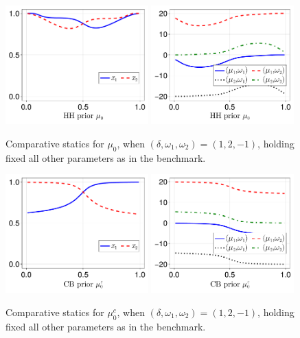 \documentclass[12pt,a4paper]{article}
\begin{document}
\begin{figure}[H]
\centering
\includegraphics[width=0.49\textwidth]{figures/V8/γ_10/fig_optimal_π_across_μ_0_ω_1_2_ω_2_-1_δ_1.0_.pdf}
\includegraphics[width=0.49\textwidth]{figures/V8/γ_10/fig_posterior_across_μ_0_ω_1_2_ω_2_-1_δ_1.0_.pdf}
\caption{Comparative statics for $\mu_0$, when $(\delta,\omega_1,\omega_2)=(1,2,-1)$, holding fixed all other parameters as in the benchmark.}
\label{FigureA15}
\end{figure}

\begin{figure}[H]
\centering
\includegraphics[width=0.49\textwidth]{figures/V8/γ_10/fig_optimal_π_across_μ_0_c_ω_1_2_ω_2_-1_δ_1.0_.pdf}
\includegraphics[width=0.49\textwidth]{figures/V8/γ_10/fig_posterior_across_μ_0_c_ω_1_2_ω_2_-1_δ_1.0_.pdf}
\caption{Comparative statics for $\mu_0^c$, when $(\delta,\omega_1,\omega_2)=(1,2,-1)$, holding fixed all other parameters as in the benchmark.}
\label{FigureA16}
\end{figure}
\end{document}
